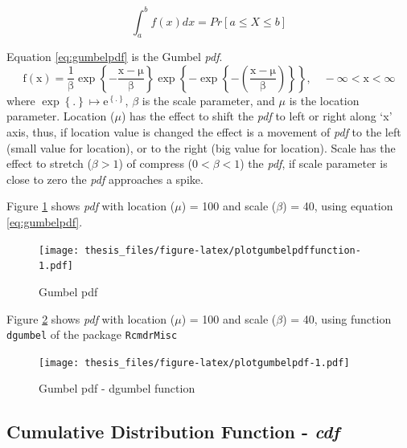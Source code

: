 \documentclass[12pt,oneside]{reedthesis}
\begin{document}
\[
\int_a^b f(x)dx = Pr[a \leq X \leq b]
\]

Equation \eqref{eq:gumbelpdf} is the Gumbel \emph{pdf}.
\begin{equation}
  \mathrm{
          f(x)=\frac{1}{\beta}
          \exp\left\{
            -\frac{x-\mu}{\beta}
          \right\}
          \exp\left\{
            -\exp\left\{
              -\left(
                \frac{x-\mu}{\beta}
              \right)
            \right\}
          \right\},
          \quad -\infty < x < \infty
         }
  \label{eq:gumbelpdf}
\end{equation}
where \(\exp\left\{.\right\} \mapsto \mathrm{e}^{\left\{.\right\}}\), \(\beta\) is the scale parameter, and \(\mu\) is the location parameter. Location (\(\mu\)) has the effect to shift the \emph{pdf} to left or right along `x' axis, thus, if location value is changed the effect is a movement of \emph{pdf} to the left (small value for location), or to the right (big value for location). Scale has the effect to stretch (\(\beta > 1\)) of compress (\(0 < \beta< 1\)) the \emph{pdf}, if scale parameter is close to zero the \emph{pdf} approaches a spike.

Figure \ref{fig:plotgumbelpdffunction} shows \emph{pdf} with location (\(\mu\)) = 100 and scale (\(\beta\)) = 40, using equation \eqref{eq:gumbelpdf}.

\footnotesize
\begin{figure}
\centering
\texttt{[image: thesis\_files/figure-latex/plotgumbelpdffunction-1.pdf]}
\caption{\label{fig:plotgumbelpdffunction}Gumbel pdf}
\end{figure}
\normalsize

Figure \ref{fig:plotgumbelpdf} shows \emph{pdf} with location (\(\mu\)) = 100 and scale (\(\beta\)) = 40, using function \texttt{dgumbel} of the package \texttt{RcmdrMisc}

\footnotesize
\begin{figure}
\centering
\texttt{[image: thesis\_files/figure-latex/plotgumbelpdf-1.pdf]}
\caption{\label{fig:plotgumbelpdf}Gumbel pdf - dgumbel function}
\end{figure}
\normalsize

\hypertarget{cumulative-distribution-function---cdf}{%
\subsection{\texorpdfstring{Cumulative Distribution Function - \emph{cdf}}{Cumulative Distribution Function - cdf}}\label{cumulative-distribution-function---cdf}}
\end{document}
